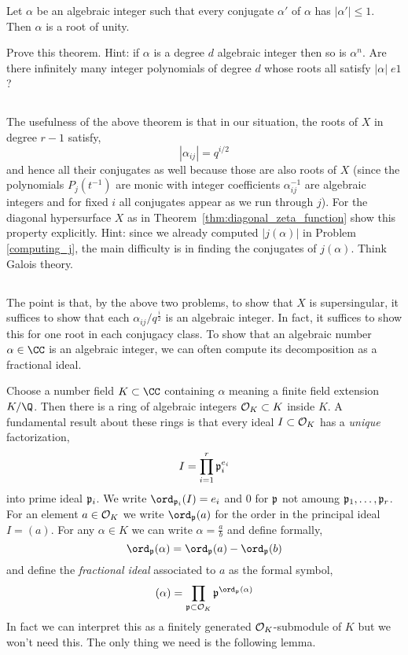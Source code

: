 \documentclass[12pt]{article}
\begin{document}
\begin{theorem}
Let $\alpha$ be an algebraic integer such that every conjugate $\alpha'$ of $\alpha$ has $|\alpha'| \le 1$. Then $\alpha$ is a root of unity.
\end{theorem}

Prove this theorem. Hint: if $\alpha$ is a degree $d$ algebraic integer then so is $\alpha^n$. Are there infinitely many integer polynomials of degree $d$ whose roots all satisfy $|\alpha| \;e 1$?

\subsection{}

The usefulness of the above theorem is that in our situation, the roots of $X$ in degree $r-1$ satisfy,
\[ |\alpha_{ij}| = q^{i/2} \]
and hence all their conjugates as well because those are also roots of $X$ (since the polynomials $P_j(t^{-1})$ are monic with integer coefficients $\alpha_{ij}^{-1}$ are algebraic integers and for fixed $i$ all conjugates appear as we run through $j$). For the diagonal hypersurface $X$ as in Theorem~\ref{thm:diagonal_zeta_function} show this property explicitly. Hint: since we already computed $|j(\alpha)|$ in Problem \ref{computing_j}, the main difficulty is in finding the conjugates of $j(\alpha)$. Think Galois theory. 

\subsection{}

The point is that, by the above two problems, to show that $X$ is supersingular, it suffices to show that each $\alpha_{ij} / q^{\frac{i}{2}}$ is an algebraic integer. In fact, it suffices to show this for one root in each conjugacy class. To show that an algebraic number $\alpha \in \CC$ is an algebraic integer, we can often compute its decomposition as a fractional ideal. 
\par
Choose a number field $K \subset \CC$ containing $\alpha$ meaning a finite field extension $K / \Q$. Then there is a ring of algebraic integers $\mathcal{O}_{K} \subset K$ inside $K$. A fundamental result about these rings is that every ideal $I \subset \mathcal{O}_{K}$ has a \textit{unique} factorization,
\[ I = \prod_{i = 1}^r \mathfrak{p}_i^{e_i} \]
into prime ideal $\mathfrak{p}_i$. We write $\ord_{\p_i}(I) = e_i$ and $0$ for $\mathfrak{p}$ not amoung $\mathfrak{p}_1, \dots, \mathfrak{p}_r$. For an element $a \in \mathcal{O}_{K}$ we write $\ord_{\p}(a)$ for the order in the principal ideal $I = (a)$. For any $\alpha \in K$ we can write $\alpha = \frac{a}{b}$ and define formally,
\[ \ord_{\p}(\alpha) = \ord_{\p}(a) - \ord_{\p}(b) \]
and define the \textit{fractional ideal} associated to $a$ as the formal symbol,
\[ (\alpha) = \prod_{\p \subset \struct{K}} \p^{\ord_{\p}(\alpha)} \]
In fact we can interpret this as a finitely generated $\mathcal{O}_{K}$-submodule of $K$ but we won't need this. The only thing we need is the following lemma.
\end{document}
